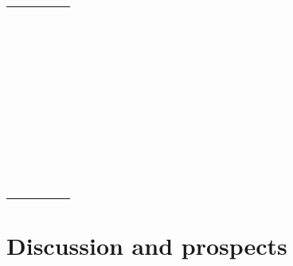 \documentclass[11pt]{rMTA2010} \usepackage[utf8]{inputenc} \usepackage{graphicx} \usepackage{booktabs} \usepackage{array} \usepackage{enumerate}
\begin{document}
\begin{tabular}{ l l l l l }
 &  &  &  \\
 &  &  &  \\
 &  &  &  \\
 &  &  &  \\
 &  &  &  \\
 &  &  &  \\
 &  &  &  \\
 &  &  &  \\
 &  &  &  \\
 &  &  &  \\
 &  &  &  \\
 &  &  &  \\
 &  &  &  \\
 &  &  &  \\
 &  &  &  \\
 &  &  &  \\
 &  &  &  \\
 &  &  &  \\
 &  &  &  \\
 &  &  &  \\
 &  &  &  \\
 &  &  &  \\
 &  &  &  \\
 &  &  &  \\
 &  &  &  \\
 &  &  &  \\
 &  &  &  \\
 &  &  &  \\
 &  &  &  \\
 &  &  &  \\
 &  &  &  \\
 &  &  &  \\
 &  &  &  \\
 &  &  &  \\
 &  &  &  \\
 &  &  &  \\
 &  &  &  \\
 &  &  &  \\
 &  &  &  \\
 &  &  & 
\end{tabular}

\vspace{4mm}



\section{Discussion and prospects}
\end{document}
